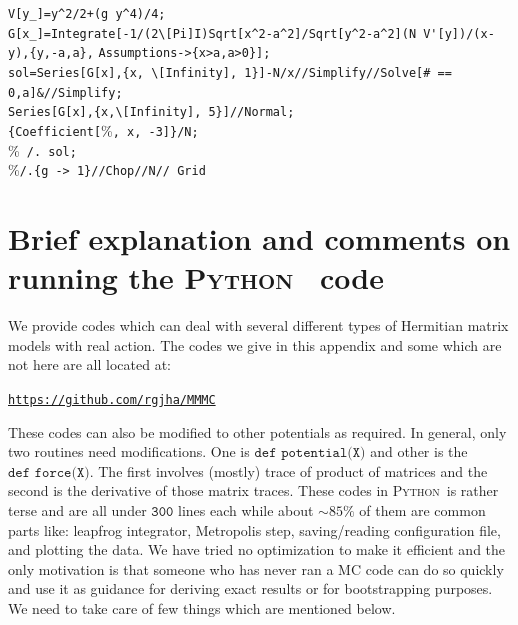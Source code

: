 \documentclass[11pt]{article}
\newcommand{\PY}{\textsc{Python}}
\begin{document}
\begin{mdframed}[backgroundcolor=magenta!3] 
	\begin{footnotesize} 
		\noindent 
		\verb"V[y_]=y^2/2+(g y^4)/4;"\\
		\verb"G[x_]=Integrate[-1/(2\[Pi]I)Sqrt[x^2-a^2]/Sqrt[y^2-a^2](N V'[y])/(x-y),{y,-a,a}," \newline
		\verb"Assumptions->{x>a,a>0}];"\\
		\verb"sol=Series[G[x],{x, \[Infinity], 1}]-N/x//Simplify//Solve[# == 0,a]&//Simplify; "\\
		\verb"Series[G[x],{x,\[Infinity], 5}]//Normal; "\\
		\verb"{Coefficient["\%\verb", x, -3]}/N;"\\
		\%\verb" /. sol;"\\
		\%\verb"/.{g -> 1}//Chop//N// Grid"
	\end{footnotesize} 
\end{mdframed}

\section{\label{sec:BEOC}Brief explanation and comments on 
running the \PY~ code}
We provide codes which can deal with several different types of 
Hermitian matrix models with real action. The codes we give 
in this appendix and some which are not here are all located at:  
\begin{center} \texttt{\href{https://github.com/rgjha/MMMC}{https://github.com/rgjha/MMMC}} \end{center}
These codes can also be modified to other potentials as required.
In general, only two routines need modifications. 
One is $\texttt{def potential(X)}$ and 
other is the $\texttt{def force(X)}$. The first involves (mostly) 
trace of product of matrices and the second is the derivative of those matrix traces. 
These codes in \PY~is rather terse
and are all under $\texttt{300}$ lines each
while about $\sim 85\%$ of them are common parts like:
leapfrog integrator, Metropolis step, saving/reading configuration file, 
and plotting the data. We have tried no optimization to make it efficient and the
only motivation is that someone who has never ran a MC code can do
so quickly and use it as guidance for deriving exact results or for
bootstrapping purposes. We need to take care of few things which are 
mentioned below.  
\end{document}
